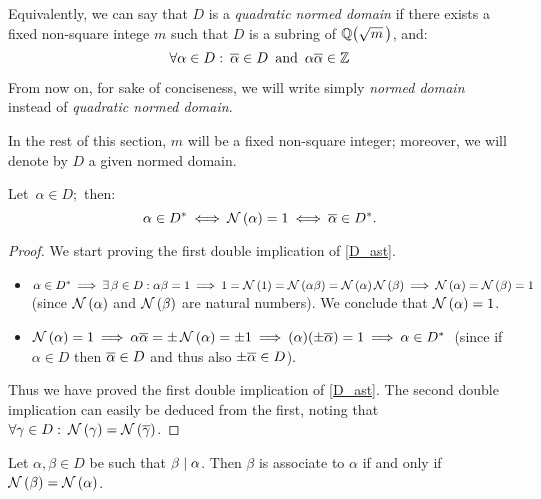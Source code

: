 Equivalently, we can say that $D$ is a \emph{quadratic
normed domain\/} if there exists a fixed non-square intege
 $m$ such that $D$ is a subring of $\QQ{m}$, and:
$$ 
\forall \alpha\in D:\: \overline{\alpha} \in D
\textrm{\,\ and\,\ } \alpha \overline{\alpha} \in \mathbb{Z}
$$

From now on, for sake of conciseness, we will
write simply \emph{normed domain\/} instead of
\emph{quadratic normed domain\/}.

\bigskip
In the rest of this section, $m$ will be a fixed
non-square integer; moreover, we will denote by $D$
a given normed domain.

\begin{lem}
Let \,$\alpha \in D$;\, then:
\begin{equation}\label{D_ast}
\alpha \in D^\ast \:\Longleftrightarrow\:
\mathcal{N}\left(\alpha\right) = 1 \:\Longleftrightarrow\:
\overline{\alpha} \in D^\ast .
\end{equation}
\end{lem}
%
\begin{proof}
%
We start proving the first double implication of
\eqref{D_ast}.

\begin{itemize}

\item $\alpha \in D^\ast \:\Longrightarrow\: \exists\, \beta \in D :
\alpha\beta = 1 \:\Longrightarrow\: 1 = \mathcal{N}\left(1\right) = \mathcal{N}\left(\alpha\beta\right) =
\mathcal{N}\left(\alpha\right)\mathcal{N}\left(\beta\right)  \:\Longrightarrow\: \mathcal{N}\left(\alpha\right) =
\mathcal{N}\left(\beta\right) = 1$ (since $\mathcal{N}\left(\alpha\right)$ and $\mathcal{N}\left(\beta\right)$
are natural numbers). We conclude that $\mathcal{N}\left(\alpha\right) = 1$.

\item $\mathcal{N}\left(\alpha\right) = 1 \:\Longrightarrow\: {\alpha \overline{\alpha}} =
\pm{\,\mathcal{N}\left(\alpha\right)} = \pm 1 \:\Longrightarrow\:
(\alpha)(\pm{\overline{\alpha}}) = 1 \:\Longrightarrow\: \alpha \in D^\ast$\,
(since if $\alpha \in D$ then $\overline{\alpha} \in D$ and thus
also $\pm\overline{\alpha} \in D$).

\end{itemize}

Thus we have proved the first double implication of
\eqref{D_ast}. The second double implication can easily
be deduced from the first, noting that
$\forall \gamma\in D:\: \mathcal{N}\left(\gamma\right)=\mathcal{N}\left(\overline{\gamma}\right)$.
%
\end{proof}

\begin{lem} Let $\alpha, \beta\in D$ be such that
$\beta \mid \alpha$.
Then $\beta$ is associate to $\alpha$ if and only if
$\mathcal{N}\left(\beta\right)=\mathcal{N}\left(\alpha\right)$.
\end{lem}

